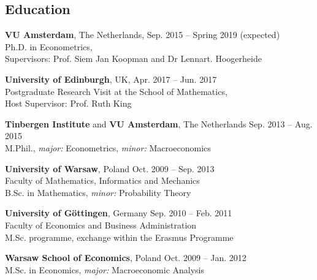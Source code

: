 \documentclass[margin,line]{resume}
\begin{document}
\begin{resume}
\vspace{-1mm}    
    \section{\mysidestyle Education}
    \textbf{VU Amsterdam},  The Netherlands, \hfill Sep. 2015 -- Spring 2019 (expected)\\
	Ph.D. in Econometrics,\\ 
    Supervisors: Prof. Siem Jan Koopman and Dr Lennart. Hoogerheide

\vspace{-1mm}

    \textbf{University of Edinburgh},  UK, \hfill Apr. 2017 -- Jun. 2017\\
	Postgraduate Research Visit at the School of Mathematics,\\ 
    Host Supervisor: Prof. Ruth King

\vspace{-1mm}

    \textbf{Tinbergen Institute} and \textbf{VU Amsterdam}, The Netherlands  \hfill Sep. 2013 -- Aug. 2015 	\\
	M.Phil., \textit{major:} Econometrics, \textit{minor:} Macroeconomics 

\vspace{-1mm}

	\textbf{University of Warsaw}, Poland  \hfill Oct. 2009 -- Sep. 2013 	
	\vspace{1mm}\\
	Faculty of Mathematics, Informatics and Mechanics \\B.Sc. in Mathematics, \textit{minor:} Probability Theory 
    
\vspace{-1mm}

	\textbf{University of G{\"o}ttingen}, Germany   \hfill Sep. 2010 -- Feb. 2011	\\
    Faculty of Economics and Business Administration \\M.Sc. programme, exchange within the Erasmus Programme

\vspace{-1mm}

	\textbf{Warsaw School of Economics}, Poland   \hfill Oct. 2009 -- Jan. 2012\\
	M.Sc. in Economics, \textit{major:} Macroeconomic Analysis


\end{resume}
\end{document}
